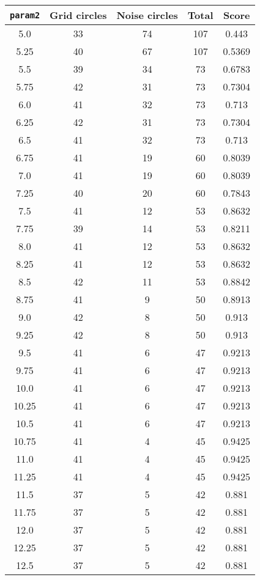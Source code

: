 \documentclass[letterpaper, 12pt]{article}
\begin{document}
\begin{longtable}{|c|c|c|c|c|}
\hline
\textbf{\texttt{param2}} & \textbf{Grid circles} & \textbf{Noise circles} & \textbf{Total} & \textbf{Score} \\
\hline
5.0 & 33 & 74 & 107 & 0.443 \\
\hline
5.25 & 40 & 67 & 107 & 0.5369 \\
\hline
5.5 & 39 & 34 & 73 & 0.6783 \\
\hline
5.75 & 42 & 31 & 73 & 0.7304 \\
\hline
6.0 & 41 & 32 & 73 & 0.713 \\
\hline
6.25 & 42 & 31 & 73 & 0.7304 \\
\hline
6.5 & 41 & 32 & 73 & 0.713 \\
\hline
6.75 & 41 & 19 & 60 & 0.8039 \\
\hline
7.0 & 41 & 19 & 60 & 0.8039 \\
\hline
7.25 & 40 & 20 & 60 & 0.7843 \\
\hline
7.5 & 41 & 12 & 53 & 0.8632 \\
\hline
7.75 & 39 & 14 & 53 & 0.8211 \\
\hline
8.0 & 41 & 12 & 53 & 0.8632 \\
\hline
8.25 & 41 & 12 & 53 & 0.8632 \\
\hline
8.5 & 42 & 11 & 53 & 0.8842 \\
\hline
8.75 & 41 & 9 & 50 & 0.8913 \\
\hline
9.0 & 42 & 8 & 50 & 0.913 \\
\hline
9.25 & 42 & 8 & 50 & 0.913 \\
\hline
9.5 & 41 & 6 & 47 & 0.9213 \\
\hline
9.75 & 41 & 6 & 47 & 0.9213 \\
\hline
10.0 & 41 & 6 & 47 & 0.9213 \\
\hline
10.25 & 41 & 6 & 47 & 0.9213 \\
\hline
10.5 & 41 & 6 & 47 & 0.9213 \\
\hline
10.75 & 41 & 4 & 45 & 0.9425 \\
\hline
11.0 & 41 & 4 & 45 & 0.9425 \\
\hline
11.25 & 41 & 4 & 45 & 0.9425 \\
\hline
11.5 & 37 & 5 & 42 & 0.881 \\
\hline
11.75 & 37 & 5 & 42 & 0.881 \\
\hline
12.0 & 37 & 5 & 42 & 0.881 \\
\hline
12.25 & 37 & 5 & 42 & 0.881 \\
\hline
12.5 & 37 & 5 & 42 & 0.881 \\

\end{longtable}
\end{document}
